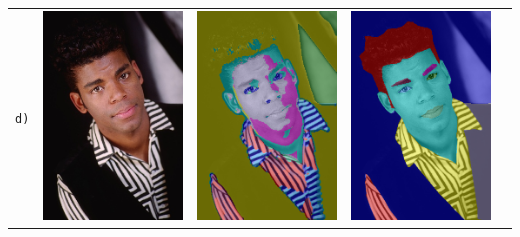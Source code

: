 \begin{table}[h!]
\begin{tabularx}{\textwidth}{>{\centering}m{}
			>{\centering}m{}
			>{\centering}m{}
			>{\centering}m{}
			>{\centering\arraybackslash}m{}}
		\texttt{d)} &
		\includegraphics[width=0.4\linewidth]{images/bsd/302008.jpg} &
		\includegraphics[width=0.4\linewidth]{images/gen/bsd_results/302008.jpg_seg.png} &
		\includegraphics[width=0.4\linewidth]{images/gen/bsd_results/302008.jpg_gt_2.png} \\
		

\end{tabularx}
\end{table}
